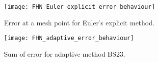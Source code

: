 \begin{figure}
    \texttt{[image: FHN\_Euler\_explicit\_error\_behaviour]}
    \caption{Error at a mesh point for Euler's explicit method.}
    \label{fig:Euler_explicit_error}
 \end{figure}
\begin{figure}
   \texttt{[image: FHN\_adaptive\_error\_behaviour]}
   \caption{Sum of error for adaptive method BS23.}
   \label{fig:adaptive_error}
\end{figure}